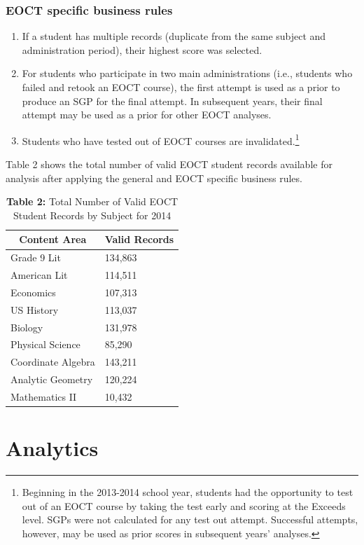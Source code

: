 \documentclass[12pt]{article}
\begin{document}
\subsubsection{EOCT specific business
rules}\label{eoct-specific-business-rules}

\begin{enumerate}
\def\labelenumi{\arabic{enumi}.}
\itemsep1pt\parskip0pt
\item
  If a student has multiple records (duplicate from the same subject and
  administration period), their highest score was selected.
\item
  For students who participate in two main administrations (i.e.,
  students who failed and retook an EOCT course), the first attempt is
  used as a prior to produce an SGP for the final attempt. In subsequent
  years, their final attempt may be used as a prior for other EOCT
  analyses.
\item
  Students who have tested out of EOCT courses are
  invalidated.\footnote{Beginning in the 2013-2014 school year, students
    had the opportunity to test out of an EOCT course by taking the test
    early and scoring at the Exceeds level. SGPs were not calculated for
    any test out attempt. Successful attempts, however, may be used as
    prior scores in subsequent years' analyses.}
\end{enumerate}

Table 2 shows the total number of valid EOCT student records available
for analysis after applying the general and EOCT specific business
rules.

\begin{table}[H]
\caption*{\textbf{Table 2:} Total Number of Valid EOCT Student Records by Subject for 2014\label{table2}} 
\begin{center}
\begin{tabular}{ll}
\hline\hline
\multicolumn{1}{c}{Content Area}&\multicolumn{1}{c}{Valid Records}\tabularnewline
\hline
Grade 9 Lit&134,863\tabularnewline
American Lit&114,511\tabularnewline
Economics&107,313\tabularnewline
US History&113,037\tabularnewline
Biology&131,978\tabularnewline
Physical Science&85,290\tabularnewline
Coordinate Algebra&143,211\tabularnewline
Analytic Geometry&120,224\tabularnewline
Mathematics II&10,432\tabularnewline
\hline
\end{tabular}\end{center}

\end{table}

\section{Analytics}\label{analytics}
\end{document}
